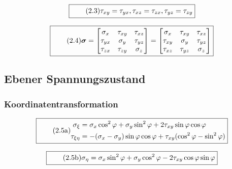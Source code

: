 \documentclass[11pt]{article}
\newcommand{\1}{ {\mathds{1}} }
\begin{document}
		\begin{equation}
			\boxed{
				\tag{2.3}
				\begin{split}
					\tau_{xy} = \tau_{yx},
					\tau_{xz} = \tau_{zx},
					\tau_{yz} = \tau_{zy}
				\end{split}
			}
		\end{equation}
		
		\begin{equation}
			\boxed{
				\tag{2.4}
				\begin{split}
					\boldsymbol{\sigma}
					=
					\begin{bmatrix*}
						\sigma_{x} & \tau_{xy}	& \tau_{xz} \\
						\tau_{yx}	& \sigma_{y} & \tau_{yz} \\
						\tau_{zx}	& \tau_{zy}	& \sigma_{z}
					\end{bmatrix*}
					=
					\begin{bmatrix*}
						\sigma_{x} & \tau_{xy}	& \tau_{xz} \\
						\tau_{xy}	& \sigma_{y} & \tau_{yz} \\
						\tau_{xz}	& \tau_{yz}	& \sigma_{z}
					\end{bmatrix*}					
				\end{split}
			}
		\end{equation}

		\subsection{Ebener Spannungszustand}
		
		\subsubsection{Koordinatentransformation}

		\begin{equation}
			\boxed{
				\tag{2.5a}
				\begin{split}
					\sigma_{\xi} &= \sigma_x \cos^2 \varphi + \sigma_y \sin^2\varphi + 2 \tau_{xy} \sin\varphi \cos\varphi\\
					\tau_{\xi \eta} &= -(\sigma_x - \sigma_y) \sin \varphi \cos \varphi + \tau_{xy} (\cos^2\varphi - \sin^2\varphi)
				\end{split}
			}
		\end{equation}
	 
		\begin{equation}
			\boxed{
				\tag{2.5b}
				\begin{split}
					\sigma_{\eta}
					=
					\sigma_{x} \sin^2 \varphi + \sigma_y \cos^2 \varphi - 2 \tau_{xy} \cos\varphi\sin\varphi
				\end{split}
			}
		\end{equation}
\end{document}

